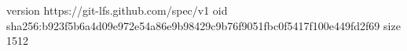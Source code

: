 version https://git-lfs.github.com/spec/v1
oid sha256:b923f5b6a4d09e972e54a86e9b98429c9b76f9051fbc0f5417f100e449fd2f69
size 1512
